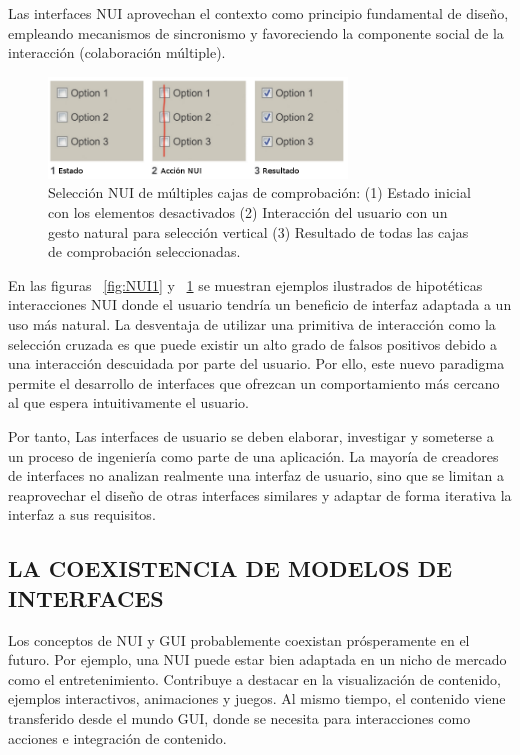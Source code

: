 \newpage

Las interfaces NUI aprovechan el contexto como principio fundamental de diseño,
empleando mecanismos de sincronismo y favoreciendo la componente social de la
interacción (colaboración múltiple).

\begin{figure}[ht]
    \begin{center}
        \includegraphics[width=300px]{src/img/check-buttons-state2.png}
        \caption[Ejemplo 2 interacción con interfaz NUI]
        {Selección NUI de múltiples cajas de comprobación: (1) Estado inicial
        con los elementos desactivados (2) Interacción del usuario con un gesto
        natural para selección vertical (3) Resultado de todas las cajas de
        comprobación seleccionadas.}
        \label{fig:NUI2}
    \end{center}
\end{figure}

En las figuras ~\ref{fig:NUI1} y ~\ref{fig:NUI2} se muestran ejemplos ilustrados
de hipotéticas interacciones NUI donde el usuario tendría un beneficio de
interfaz adaptada a un uso más natural. La desventaja de utilizar una primitiva
de interacción como la selección cruzada es que puede existir un alto grado de
falsos positivos debido a una interacción descuidada por parte del 
usuario. Por ello, este nuevo paradigma permite el desarrollo de interfaces que
ofrezcan un comportamiento más cercano al que espera intuitivamente el usuario.

Por tanto, Las interfaces de usuario se deben elaborar,
investigar y someterse a un proceso de ingeniería como parte de una aplicación.
La mayoría de creadores de interfaces no analizan realmente una interfaz de
usuario, sino que se limitan a reaprovechar el diseño de otras interfaces
similares y adaptar de forma iterativa la interfaz a sus requisitos.

\subsection{\uppercase{La coexistencia de modelos de interfaces}}

Los conceptos de NUI y GUI probablemente coexistan prósperamente en el 
futuro. Por ejemplo, una NUI puede estar bien adaptada en un nicho de mercado
como el entretenimiento. Contribuye a destacar en la visualización de 
contenido, ejemplos interactivos, animaciones y juegos. Al mismo tiempo, el
contenido viene transferido desde el mundo GUI, donde se necesita para 
interacciones como acciones e integración de contenido.

